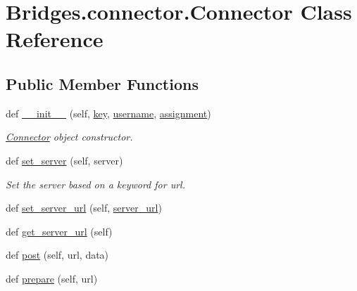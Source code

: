 \hypertarget{class_bridges_1_1connector_1_1_connector}{}\section{Bridges.\+connector.\+Connector Class Reference}
\label{class_bridges_1_1connector_1_1_connector}
\subsection*{Public Member Functions}
\begin{DoxyCompactItemize}
\item 
def \mbox{\hyperlink{class_bridges_1_1connector_1_1_connector_aadfd9186c6d989ae7981270560d9ee36}{\+\_\+\+\_\+init\+\_\+\+\_\+}} (self, \mbox{\hyperlink{class_bridges_1_1connector_1_1_connector_abea85b824f7ab9c52c70c9d6bcf4fa74}{key}}, \mbox{\hyperlink{class_bridges_1_1connector_1_1_connector_aeab093f0dd4b59e46ab280bf7af5ffb8}{username}}, \mbox{\hyperlink{class_bridges_1_1connector_1_1_connector_a1f6453ca6554da7ea99be8e55b51b4bf}{assignment}})
\begin{DoxyCompactList}\small\item\em \mbox{\hyperlink{class_bridges_1_1connector_1_1_connector}{Connector}} object constructor. \end{DoxyCompactList}\item 
def \mbox{\hyperlink{class_bridges_1_1connector_1_1_connector_abf1fd0ecfb8b34a9093fcb3fd66e4383}{set\+\_\+server}} (self, server)
\begin{DoxyCompactList}\small\item\em Set the server based on a keyword for url. \end{DoxyCompactList}\item 
def \mbox{\hyperlink{class_bridges_1_1connector_1_1_connector_a4d94a6661535eabc0d29b9c5fd8c53ea}{set\+\_\+server\+\_\+url}} (self, \mbox{\hyperlink{class_bridges_1_1connector_1_1_connector_a8795d2c7dca04e053f89ded81fe1a119}{server\+\_\+url}})
\item 
def \mbox{\hyperlink{class_bridges_1_1connector_1_1_connector_afc3ab8dc9ec3e7bfc22b036ec9a14c54}{get\+\_\+server\+\_\+url}} (self)
\item 
def \mbox{\hyperlink{class_bridges_1_1connector_1_1_connector_ab0e2e57569bf48efc114cd961a1c6613}{post}} (self, url, data)
\item 
def \mbox{\hyperlink{class_bridges_1_1connector_1_1_connector_acc031e5649eb14e152bac2cb9c2a744d}{prepare}} (self, url)
\end{DoxyCompactItemize}
